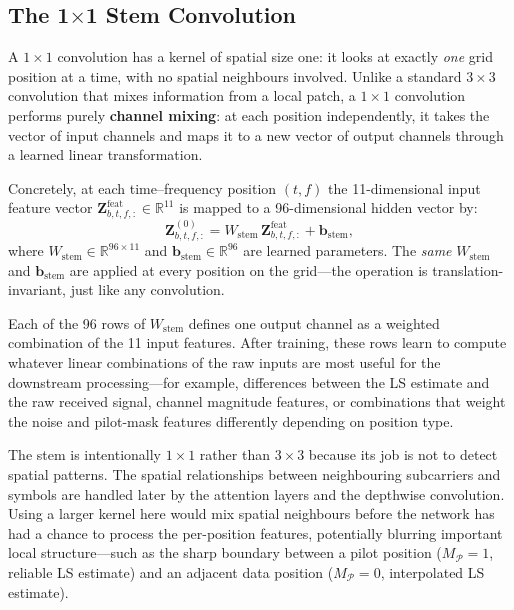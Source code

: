\documentclass[11pt,a4paper]{article}
\newcommand{\bZ}{\mathbf{Z}}
\begin{document}
	\subsection{The 1$\times$1 Stem Convolution}
	
	A $1 \times 1$ convolution has a kernel of spatial size one: it looks at exactly \emph{one} grid position at a time, with no spatial neighbours involved.  Unlike a standard $3 \times 3$ convolution that mixes information from a local patch, a $1 \times 1$ convolution performs purely \textbf{channel mixing}: at each position independently, it takes the vector of input channels and maps it to a new vector of output channels through a learned linear transformation.
	
	Concretely, at each time--frequency position $(t,f)$ the 11-dimensional input feature vector $\bZ^{\mathrm{feat}}_{b,t,f,:} \in \mathbb{R}^{11}$ is mapped to a 96-dimensional hidden vector by:
	\begin{equation}
		\bZ^{(0)}_{b,t,f,:} = W_{\mathrm{stem}}\,\bZ^{\mathrm{feat}}_{b,t,f,:} + \mathbf{b}_{\mathrm{stem}},
		\label{eq:stem}
	\end{equation}
	where $W_{\mathrm{stem}} \in \mathbb{R}^{96 \times 11}$ and $\mathbf{b}_{\mathrm{stem}} \in \mathbb{R}^{96}$ are learned parameters.  The \emph{same} $W_{\mathrm{stem}}$ and $\mathbf{b}_{\mathrm{stem}}$ are applied at every position on the grid---the operation is translation-invariant, just like any convolution.
	
	Each of the 96 rows of $W_{\mathrm{stem}}$ defines one output channel as a weighted combination of the 11 input features.  After training, these rows learn to compute whatever linear combinations of the raw inputs are most useful for the downstream processing---for example, differences between the LS estimate and the raw received signal, channel magnitude features, or combinations that weight the noise and pilot-mask features differently depending on position type.
	
	The stem is intentionally $1 \times 1$ rather than $3 \times 3$ because its job is not to detect spatial patterns.  The spatial relationships between neighbouring subcarriers and symbols are handled later by the attention layers and the depthwise convolution.  Using a larger kernel here would mix spatial neighbours before the network has had a chance to process the per-position features, potentially blurring important local structure---such as the sharp boundary between a pilot position ($M_{\mathcal{P}} = 1$, reliable LS estimate) and an adjacent data position ($M_{\mathcal{P}} = 0$, interpolated LS estimate).
	
\end{document}
